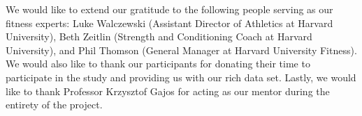We would like to extend our gratitude to the following people serving as our fitness experts: Luke Walczewski (Assistant Director of Athletics at Harvard University),  Beth Zeitlin (Strength and Conditioning Coach at Harvard University), and Phil Thomson (General Manager at Harvard University Fitness).  We would also like to thank our participants for donating their time to participate in the study and providing us with our rich data set.  Lastly, we would like to thank Professor Krzysztof Gajos for acting as our mentor during the entirety of the project.
